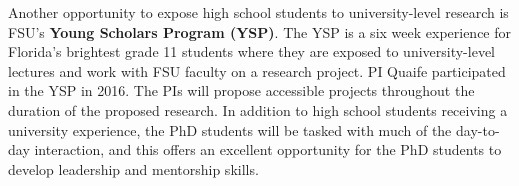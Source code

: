 \documentclass[11pt]{article}
\begin{document}
Another opportunity to expose high school students to university-level research is FSU's {\bf Young Scholars Program (YSP)}. The YSP is a six week experience for Florida's brightest grade 11 students where they are exposed to university-level lectures and work with FSU faculty on a research project. PI Quaife participated in the YSP in 2016. The PIs will propose accessible projects throughout the duration of the proposed research. In addition to high school students receiving a university experience, the PhD students will be tasked with much of the day-to-day interaction, and this offers an excellent opportunity for the PhD students to develop leadership and mentorship skills.


\newpage
\setcounter{page}{1}

%

\end{document}
